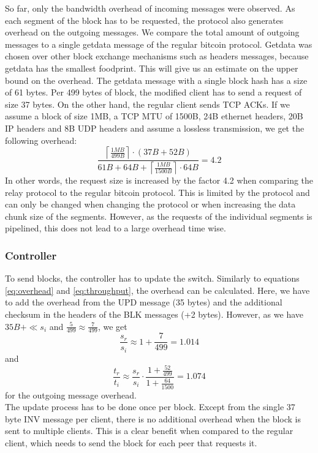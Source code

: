 So far, only the bandwidth overhead of incoming messages were observed. As each segment of the block has to be requested, the protocol also generates overhead on the outgoing messages. We compare the total amount of outgoing messages to a single getdata message of the regular bitcoin protocol. Getdata was chosen over other block exchange mechanisms such as headers messages, because getdata has the smallest foodprint. This will give us an estimate on the upper bound on the overhead. The getdata message with a single block hash has a size of 61 bytes. Per 499 bytes of block, the modified client has to send a request of size 37 bytes. On the other hand, the regular client sends TCP ACKs. If we assume a block of size 1MB, a TCP MTU of 1500B, 24B ethernet headers, 20B IP headers and 8B UDP headers and assume a lossless transmission, we get the following overhead:
\begin{equation}
	\frac{\left\lceil \frac{1MB}{499B} \right\rceil \cdot (37B + 52B)}{61B + 64B + \left\lceil \frac{1MB}{1500B} \right\rceil\cdot 64B} = 4.2
\end{equation}
In other words, the request size is increased by the factor 4.2 when comparing the relay protocol to the regular bitcoin protocol. This is limited by the protocol and can only be changed when changing the protocol or when increasing the data chunk size of the segments. However, as the requests of the individual segments is pipelined, this does not lead to a large overhead time wise. 



\subsubsection{Controller}
To send blocks, the controller has to update the switch. Similarly to equations \ref{eq:overhead} and \ref{eq:throughput}, the overhead can be calculated. Here, we have to add the overhead from the UPD message (35 bytes) and the additional checksum in the headers of the BLK messages (+2 bytes). However, as we have $35B + \ll s_i$ and $\frac{5}{499}\approx\frac{7}{499}$, we get
\begin{equation}
	\frac{s_r}{s_i} \approx 1+\frac{7}{499} = 1.014
\end{equation}
and 
\begin{equation} \label{eq:throughput}
	\frac{t_r}{t_i}\approx \frac{s_r}{s_i} \cdot\frac{1+\frac{52}{499}}{1+\frac{64}{1500}} = 1.074
\end{equation}
for the outgoing message overhead.\\
The update process has to be done once per block. Except from the single 37 byte INV message per client, there is no additional overhead when the block is sent to multiple clients. This is a clear benefit when compared to the regular client, which needs to send the block for each peer that requests it.





















